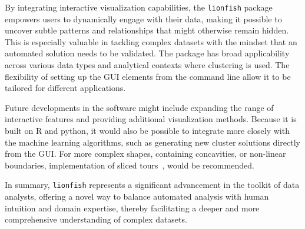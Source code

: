 \documentclass[article]{ajs}
\begin{document}
By integrating interactive visualization capabilities, the \texttt{lionfish} package empowers users to dynamically engage with their data, making it possible to uncover subtle patterns and relationships that might otherwise remain hidden. This is especially valuable in tackling complex datasets with the mindset that an automated solution needs to be validated. The package has broad applicability across various data types and analytical contexts where clustering is used. The flexibility of setting up the GUI elements from the command line allow it to be tailored for different applications.

Future developments in the software might include expanding the range of interactive features and providing additional visualization methods.  Because it is built on R and python, it would also be possible to integrate more closely with the machine learning algorithms, such as generating new cluster solutions directly from the GUI. For more complex shapes, containing concavities, or non-linear boundaries, implementation of sliced tours~\citep{Laa2020}, would be recommended.

In summary, \texttt{lionfish} represents a significant advancement in the toolkit of data analysts, offering a novel way to balance automated analysis with human intuition and domain expertise, thereby facilitating a deeper and more comprehensive understanding of complex datasets.


%

\end{document}
